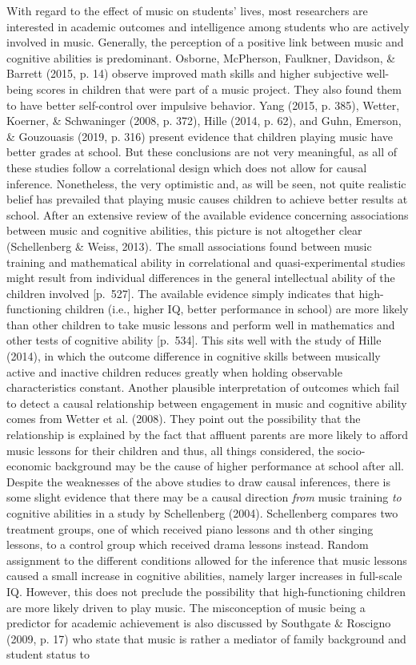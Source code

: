 \documentclass[a4, 12pt]{article}
\begin{document}
\label{ch:roleofmusic}
With regard to the effect of music on students' lives, most researchers are interested in academic outcomes and intelligence among students who are actively involved in music. Generally, the perception of a positive link between music and cognitive abilities is predominant. Osborne, McPherson, Faulkner, Davidson, \& Barrett (2015, p. 14) observe improved math skills and higher subjective well-being scores in children that were part of a music project. They also found them to have better self-control over impulsive behavior. Yang (2015, p. 385), Wetter, Koerner, \& Schwaninger (2008, p. 372), Hille (2014, p. 62), and Guhn, Emerson, \& Gouzouasis (2019, p. 316) present evidence that children playing music have better grades at school. But these conclusions are not very meaningful, as all of these studies follow a correlational design which does not allow for causal inference. Nonetheless, the very optimistic and, as will be seen, not quite realistic belief has prevailed that playing music causes children to achieve better results at school. After an extensive review of the available evidence concerning associations between music and cognitive abilities, this picture is not altogether clear (Schellenberg \& Weiss, 2013). The small associations found between music training and mathematical ability in correlational and quasi-experimental studies might result from individual differences in the general intellectual ability of the children involved {[}p.~527{]}. The available evidence simply indicates that high-functioning children (i.e., higher IQ, better performance in school) are more likely than other children to take music lessons and perform well in mathematics and other tests of cognitive ability {[}p.~534{]}. This sits well with the study of Hille (2014), in which the outcome difference in cognitive skills between musically active and inactive children reduces greatly when holding observable characteristics constant. Another plausible interpretation of outcomes which fail to detect a causal relationship between engagement in music and cognitive ability comes from Wetter et al. (2008). They point out the possibility that the relationship is explained by the fact that affluent parents are more likely to afford music lessons for their children and thus, all things considered, the socio-economic background may be the cause of higher performance at school after all. Despite the weaknesses of the above studies to draw causal inferences, there is some slight evidence that there may be a causal direction \emph{from} music training \emph{to} cognitive abilities in a study by Schellenberg (2004). Schellenberg compares two treatment groups, one of which received piano lessons and th other singing lessons, to a control group which received drama lessons instead. Random assignment to the different conditions allowed for the inference that music lessons caused a small increase in cognitive abilities, namely larger increases in full-scale IQ. However, this does not preclude the possibility that high-functioning children are more likely driven to play music. The misconception of music being a predictor for academic achievement is also discussed by Southgate \& Roscigno (2009, p. 17) who state that music is rather a mediator of family background and student status to 
\end{document}
